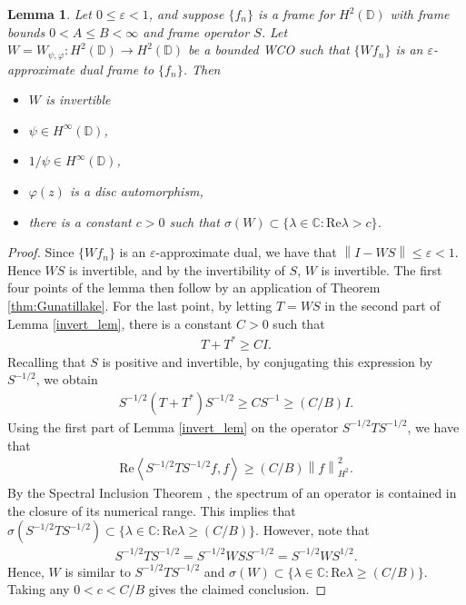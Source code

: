 \documentclass{amsart}
\newtheorem{lem}[thm]{Lemma}
\theoremstyle{definition}
\theoremstyle{remark}
\numberwithin{equation}{section}
\newcommand{\ip}[2]{\left\langle {#1} , {#2} \right\rangle} %
\newcommand{\norm}[1]{\left\lVert #1 \right\rVert} %
\begin{document}
\begin{lem}\label{spec_lem}
    Let $0 \leq \varepsilon<1$, and suppose $\{f_{n}\}$ is a frame for $H^{2}(\mathbb{D})$ with frame bounds $0<A\leq B<\infty$ and frame operator $S$. Let $W=W_{\psi,\varphi}:H^{2}(\mathbb{D})\to H^{2}(\mathbb{D})$ be a bounded WCO such that $\{Wf_{n}\}$ is an $\varepsilon$-approximate dual frame to $\{f_{n}\}$. Then 
    \begin{itemize}
        \item[1.] $W$ is invertible
        \item[2.] $\psi\in H^{\infty}(\mathbb{D})$,
        \item[3.] $1/\psi\in H^{\infty}(\mathbb{D})$,
        \item[4.] $\varphi(z)$ is a disc automorphism,
        \item[5.] there is a constant $c>0$ such that $\sigma(W)\subset\{\lambda\in\mathbb{C}:\text{Re} \lambda>c\}$.
    \end{itemize}
\end{lem}
\begin{proof}
    Since $\{Wf_{n}\}$ is an $\varepsilon$-approximate dual, we have that $\norm{I-WS}\leq\varepsilon<1$. Hence $WS$ is invertible, and by the invertibility of $S$, $W$ is invertible. The first four points of the lemma then follow by an application of Theorem \ref{thm:Gunatillake}. For the last point, by letting $T=WS$ in the second part of Lemma \ref{invert_lem}, there is a constant $C>0$ such that 
    \begin{align*}
        T+T^{*}\geq CI.
    \end{align*}
    Recalling that $S$ is positive and invertible, by conjugating this expression by $S^{-1/2}$, we obtain 
    \begin{align*}
        S^{-1/2}\left(T+T^{*}\right)S^{-1/2}\geq CS^{-1}\geq (C/B)I.
    \end{align*}
    Using the first part of Lemma \ref{invert_lem} on the operator $S^{-1/2}TS^{-1/2}$, we have that 
    \begin{align*}
        \text{Re}\ip{S^{-1/2}TS^{-1/2}f}{f}\geq (C/B)\norm{f}_{H^{2}}^{2}.
    \end{align*}
    By the Spectral Inclusion Theorem \cite{lax2014functional}, the spectrum of an operator is contained in the closure of its numerical range. This implies that $\sigma(S^{-1/2}TS^{-1/2})\subset\{\lambda \in \mathbb{C}: \text{Re}\lambda\geq (C/B)\}$. However, note that 
    \begin{align*}
        S^{-1/2}TS^{-1/2}=S^{-1/2}WSS^{-1/2}=S^{-1/2}WS^{1/2}.
    \end{align*}
    Hence, $W$ is similar to $S^{-1/2}TS^{-1/2}$ and $\sigma(W)\subset\{\lambda \in \mathbb{C}: \text{Re}\lambda\geq (C/B)\}$. Taking any $0<c<C/B$ gives the claimed conclusion.
\end{proof}
\end{document}
